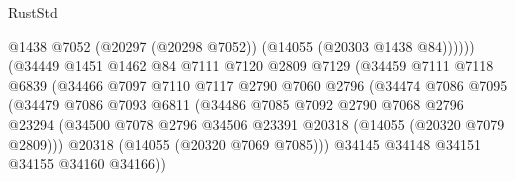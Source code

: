 \begin{lexlean}{RustStd}
\begin{coremodule}
                                          @1438
                                          @7052
                                          (@20297 (@20298 @7052))
                                          (@14055 (@20303 @1438 @84))))))
                                  (@34449
                                    @1451
                                    @1462
                                    @84
                                    @7111
                                    @7120
                                    @2809
                                    @7129
                                    (@34459
                                      @7111
                                      @7118
                                      @6839
                                      (@34466
                                        @7097
                                        @7110
                                        @7117
                                        @2790
                                        @7060
                                        @2796
                                        (@34474
                                          @7086
                                          @7095
                                          (@34479
                                            @7086
                                            @7093
                                            @6811
                                            (@34486
                                              @7085
                                              @7092
                                              @2790
                                              @7068
                                              @2796
                                              @23294
                                              (@34500
                                                @7078
                                                @2796
                                                @34506
                                                @23391
                                                @20318
                                                (@14055 (@20320 @7079 @2809)))
                                              @20318
                                              (@14055 (@20320 @7069 @7085)))
                                            @34145
                                            @34148
                                            @34151
                                            @34155
                                            @34160
                                            @34166))

\end{coremodule}
\end{lexlean}

